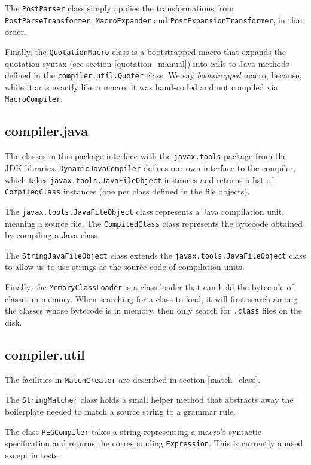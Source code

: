 The \texttt{PostParser} class simply applies the transformations from
\texttt{PostParseTransformer}, \texttt{MacroExpander} and
\texttt{PostExpansionTransformer}, in that order.

Finally, the \texttt{QuotationMacro} class is a bootstrapped macro that expands
the quotation syntax (see section \ref{quotation_manual}) into calls to Java
methods defined in the \texttt{compiler.util.Quoter} class. We say
\emph{bootstrapped} macro, because, while it acts exactly like a macro, it was
hand-coded and not compiled via \texttt{MacroCompiler}.

\subsection{compiler.java}

The classes in this package interface with the \texttt{javax.tools} package from
the JDK libraries. \texttt{DynamicJavaCompiler} defines our own interface to the
compiler, which takes \texttt{javax.tools.JavaFileObject} instances and returns
a list of \texttt{CompiledClass} instances (one per class defined in the file
objects).

The \texttt{javax.tools.JavaFileObject} class represents a Java compilation
unit, meaning a source file. The \texttt{CompiledClass} class represents the
bytecode obtained by compiling a Java class.

The \texttt{StringJavaFileObject} class extends the
\texttt{javax.tools.JavaFileObject} class to allow us to use strings as the
source code of compilation units.

Finally, the \texttt{MemoryClassLoader} is a class loader that can hold the
bytecode of classes in memory. When searching for a class to load, it will first
search among the classes whose bytecode is in memory, then only search for
\texttt{.class} files on the disk.

\subsection{compiler.util}

The facilities in \texttt{MatchCreator} are described in section
\ref{match_class}.

The \texttt{StringMatcher} class holds a small helper method that abstracts away
the boilerplate needed to match a source string to a grammar rule.

The class \texttt{PEGCompiler} takes a string representing a macro's syntactic
specification and returns the corresponding \texttt{Expression}. This is
currently unused except in tests.

